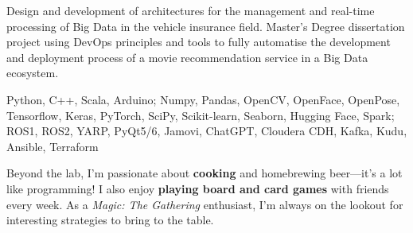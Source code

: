 \documentclass[10pt,a4paper,ragged2e]{altacv}
\begin{document}
    \divider    
    
    Design and development of architectures for the management and real-time processing of Big Data in the vehicle insurance field. Master's Degree dissertation project using DevOps principles and tools to fully automatise the development and deployment process of a movie recommendation service in a Big Data ecosystem.

    \divider    
    
    
\clearpage

\begin{fullwidth}

  \printbibliography[heading=pubtype,title=\empty, type=misc]

  \nocite{*}

  \printbibliography[heading=pubtype,title={\printinfo{\faFileTextO}{Journal}}, type=article]
  \divider

  \printbibliography[heading=pubtype,title={\printinfo{\faFileTextO}{Conference Proceedings}}, type=inproceedings]

  \divider

  Python, C++, Scala, Arduino; Numpy, Pandas, OpenCV, OpenFace, OpenPose, Tensorflow, Keras, PyTorch, SciPy, Scikit-learn, Seaborn, Hugging Face, Spark; ROS1, ROS2, YARP, PyQt5/6, Jamovi, ChatGPT, Cloudera CDH, Kafka, Kudu, Ansible, Terraform

  Beyond the lab, I'm passionate about \textbf{cooking} and homebrewing beer—it’s a lot like programming! I also enjoy \textbf{playing board and card games} with friends every week. As a \textit{Magic: The Gathering} enthusiast, I'm always on the lookout for interesting strategies to bring to the table.


\end{fullwidth}
\end{document}
